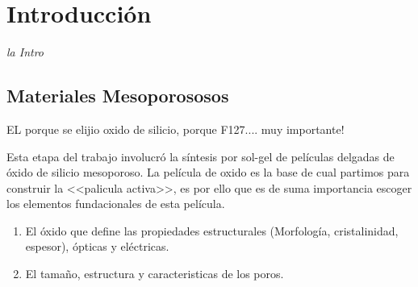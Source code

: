  \newcommand{\NoBiblioIntro}[1]{
 \ifthenelse{\equal{#1}{verdadero}}{}{}
 \NoBiblioIntro{verdadero}}


 \FormatoCapituloUnaLinea

 \chapter{Introducción}\label{chap:Introduccion}

 \thispagestyle{empty}
	
 \noindent\textit{la Intro}

 
 \vfill
 \minitoc
 \newpage


\section{Materiales Mesoporososos}\label{sec:mesoporosos}

				EL porque se elijio oxido de silicio, porque F127.... muy importante!
				
				Esta etapa del trabajo involucró la síntesis por sol-gel de películas delgadas de óxido de silicio mesoporoso. La película de oxido es la base de cual partimos para construir la <<palicula activa>>, es por ello que es de suma importancia escoger los elementos fundacionales de esta película.
				\begin{enumerate}
					\item El óxido que define las propiedades estructurales (Morfología, cristalinidad, espesor), ópticas y eléctricas.
					\item El tamaño, estructura y caracteristicas de los poros.
				\end{enumerate}

